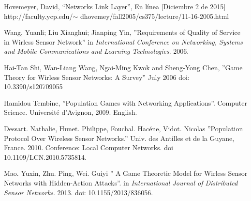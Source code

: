 \documentclass[journal]{IEEEtran}
\begin{document}
\begin{thebibliography}{15}
 Hovemeyer, David, ``Networks Link Layer'', En línea [Diciembre 2 de 2015] \textit{}{http://faculty.ycp.edu/$\sim$ dhovemey/fall2005/cs375/lecture/11-16-2005.html}

 Wang, Yuanli; Liu Xianghui; Jianping Yin, ''Requirements of Quality of Service in Wirless Sensor Network'' in \textit{International Conference on Networking, Systems and Mobile Communications and Learning Technologies}. 2006.

 Hai-Tan Shi, Wan-Liang Wang, Ngai-Ming Kwok and Sheng-Yong Chen, ''Game Theory for Wirless Sensor Networks: A Survey'' July 2006 doi: 10.3390/s120709055

 Hamidou Tembine, ''Population Games with Networking Applications''. Computer Science. Université d'Avignon, 2009. English.

 Dessart. Nathalie, Hunet. Philippe, Fouchal. Hacéne, Vidot. Nicolas ''Population Protocol Over Wireless Sensor Networks.'' Univ. des Antilles et de la Guyane, France. 2010. Conference: Local Computer Networks. doi 10.1109/LCN.2010.5735814.

 Mao. Yuxin, Zhu. Ping, Wei. Guiyi '' A Game Theoretic Model for Wirless Sensor Networks with Hidden-Action Attacks''. in \textit{International Journal of Distributed Sensor Networks}. 2013. doi: 10.1155/2013/836056.

\end{thebibliography}
\end{document}
